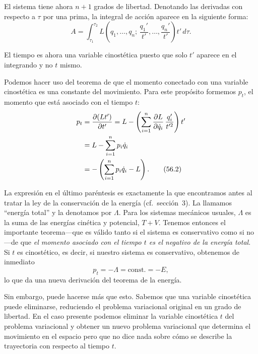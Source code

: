\documentclass[12pt,a4paper]{book}
\begin{document}
El sistema tiene ahora $n + 1$ grados de libertad. Denotando las derivadas con respecto a $\tau$ por una prima, la integral de acción aparece en la siguiente forma:
\begin{equation}
A = \int_{\tau_1}^{\tau_2} L\left(q_1, \ldots, q_n;\, \frac{q_1'}{t'}, \ldots, \frac{q_n'}{t'}\right) t' \, d\tau. \tag{56.1}
\end{equation}

El tiempo es ahora una variable cinostética puesto que solo $t'$ aparece en el integrando y no $t$ mismo.

Podemos hacer uso del teorema de que el momento conectado con una variable cinostética es una constante del movimiento. Para este propósito formemos $p_t$, el momento que está asociado con el tiempo $t$:
\begin{align}
p_t &= \frac{\partial(Lt')}{\partial t'} = L - \left(\sum_{i=1}^{n} \frac{\partial L}{\partial \dot{q}_i}\,\frac{q_i'}{t'^2}\right) t' \notag \\
&= L - \sum_{i=1}^{n} p_i \dot{q}_i \notag \\
&= -\left(\sum_{i=1}^{n} p_i \dot{q}_i - L\right). \tag{56.2}
\end{align}

La expresión en el último paréntesis es exactamente la que encontramos antes al tratar la ley de la conservación de la energía (cf.\ sección~3). La llamamos ``energía total'' y la denotamos por $\Lambda$. Para los sistemas mecánicos usuales, $\Lambda$ es la suma de las energías cinética y potencial, $T + V$. Tenemos entonces el importante teorema---que es válido tanto si el sistema es conservativo como si no---de que \textit{el momento asociado con el tiempo $t$ es el negativo de la energía total}. Si $t$ es cinostético, es decir, si nuestro sistema es conservativo, obtenemos de inmediato
\begin{equation}
p_t = -\Lambda = \text{const.} = -E, \tag{56.3}
\end{equation}
lo que da una nueva derivación del teorema de la energía.

Sin embargo, puede hacerse más que esto. Sabemos que una variable cinostética puede eliminarse, reduciendo el problema variacional original en un grado de libertad. En el caso presente podemos eliminar la variable cinostética $t$ del problema variacional y obtener un nuevo problema variacional que determina el movimiento en el espacio pero que no dice nada sobre cómo se describe la trayectoria con respecto al tiempo $t$.

\end{document}
